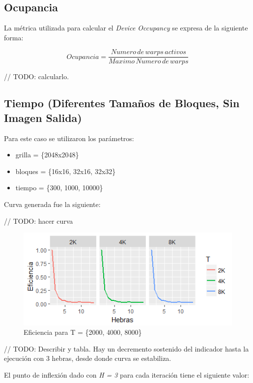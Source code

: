 \documentclass[jou]{apa6}
\begin{document}
\FloatBarrier

\subsection{Ocupancia}
La métrica utilizada para calcular el \textit{Device Occupancy} se expresa de la siguiente forma:

\[
	Ocupancia = \frac{Numero\, de\, warps\, activos}{Maximo\, Numero\, de\, warps}
\]

// TODO: calcularlo.

\subsection{Tiempo (Diferentes Tamaños de Bloques, Sin Imagen Salida)}
Para este caso se utilizaron los parámetros:

\begin{itemize}
	\item grilla = \{2048x2048\}
	\item bloques = \{16x16, 32x16, 32x32\}
	\item tiempo = \{300, 1000, 10000\}
\end{itemize}

Curva generada fue la siguiente:

// TODO: hacer curva
\begin{figure}[h]
	\includegraphics[width=\columnwidth]{time-diff-block-size-no-raw.png}
	\caption{Eficiencia para T = \{2000, 4000, 8000\}}
	\label{fig:Figure3}
\end{figure}

// TODO: Describir y tabla.
Hay un decremento sostenido del indicador hasta la ejecución con 3 hebras, desde donde curva se estabiliza.

El punto de inflexión dado con \textit{H = 3} para cada iteración tiene el siguiente valor:
\end{document}
